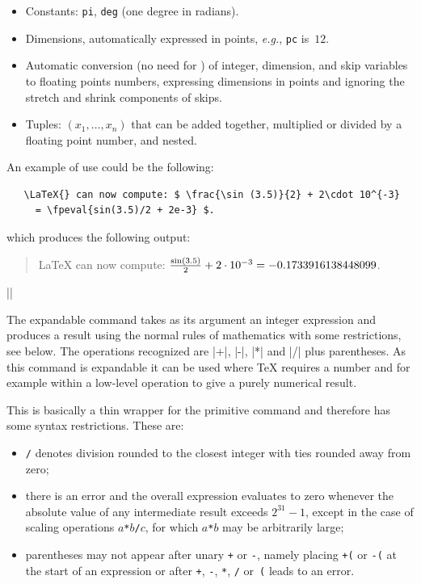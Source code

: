 \documentclass{ltxguide}
\begin{document}
\begin{itemize}
  \item Constants: \texttt{pi}, \texttt{deg} (one degree in radians).
  \item Dimensions, automatically expressed in points, \emph{e.g.},
    \texttt{pc} is~$12$.
  \item Automatic conversion (no need for ) of
    integer, dimension, and skip variables to floating points numbers,
    expressing dimensions in points and ignoring the stretch and
    shrink components of skips.
  \item Tuples: $(x_1,\ldots{},x_n)$ that can be added together,
    multiplied or divided by a floating point number, and nested.
\end{itemize}

An example of use could be the following:
\begin{verbatim}
   \LaTeX{} can now compute: $ \frac{\sin (3.5)}{2} + 2\cdot 10^{-3}
     = \fpeval{sin(3.5)/2 + 2e-3} $.
\end{verbatim}
which produces the following output:
\begin{quote}
  \LaTeX{} can now compute: $ \frac{\sin (3.5)}{2} + 2\cdot 10^{-3}
  = \fpeval{sin(3.5)/2 + 2e-3} $.
\end{quote}

\begin{decl}
  |\inteval| 
\end{decl}

  The expandable command  takes as its argument an integer
  expression and produces a result using the normal rules of
  mathematics with some restrictions, see below. The operations
  recognized are |+|, |-|, |*| and |/| plus parentheses.  As this
  command is expandable it can be used where \TeX{} requires a number
  and for example within a low-level  operation to give a
  purely numerical result.

  This is basically a thin wrapper for the primitive 
  command and therefore has some syntax restrictions. These are:
  \begin{itemize}
  \item \texttt{/} denotes division rounded to the closest integer with
    ties rounded away from zero;
  \item there is an error and the overall expression evaluates to zero
    whenever the absolute value of any intermediate result exceeds
    $2^{31}-1$, except in the case of scaling operations
    $a$\texttt{*}$b$\texttt{/}$c$, for which $a$\texttt{*}$b$ may be
    arbitrarily large;
  \item parentheses may not appear after unary \texttt{+} or
    \texttt{-}, namely placing \texttt{+(} or \texttt{-(} at the start
    of an expression or after \texttt{+}, \texttt{-}, \texttt{*},
    \texttt{/} or~\texttt{(} leads to an error.
  \end{itemize}
\end{document}
